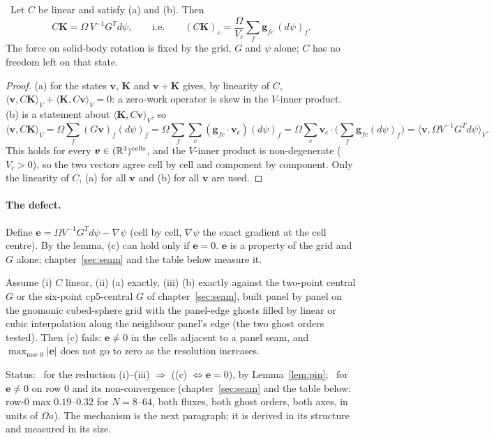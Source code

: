\begin{lemma}[pinning]\label{lem:pin}\derived\
Let $C$ be linear and satisfy (a) and (b). Then
\[ C\bm K=\Omega\,V^{-1}G^{T}d\psi ,\qquad\text{i.e.}\qquad
   (C\bm K)_c=\frac{\Omega}{V_c}\sum_f \bm g_{fc}\,(d\psi)_f . \]
The force on solid-body rotation is fixed by the grid, $G$ and $\psi$ alone; $C$ has no freedom left on that state.
\end{lemma}
\begin{proof}
(a) for the states $\bm v$, $\bm K$ and $\bm v+\bm K$ gives, by linearity of $C$,
$\langle\bm v,C\bm K\rangle_V+\langle\bm K,C\bm v\rangle_V=0$: a zero-work operator is skew in the $V$-inner
product. (b) is a statement about $\langle\bm K,C\bm v\rangle_V$, so
\[ \langle\bm v,C\bm K\rangle_V=\Omega\sum_f (G\bm v)_f(d\psi)_f=\Omega\sum_f\sum_c (\bm g_{fc}\cdot\bm v_c)(d\psi)_f
   =\Omega\sum_c \bm v_c\cdot\Big(\sum_f \bm g_{fc}(d\psi)_f\Big)=\langle\bm v,\Omega V^{-1}G^T d\psi\rangle_V .\]
This holds for every $\bm v\in(\mathbb R^3)^{\rm cells}$, and the $V$-inner product is non-degenerate ($V_c>0$),
so the two vectors agree cell by cell and component by component. Only the linearity of $C$, (a) for all $\bm v$
and (b) for all $\bm v$ are used.
\end{proof}

\paragraph{The defect.} Define $\bm e=\Omega V^{-1}G^T d\psi-\nabla\psi$ (cell by cell, $\nabla\psi$ the exact
gradient at the cell centre). By the lemma, (c) can hold only if $\bm e=0$. $\bm e$ is a property of the grid
and $G$ alone; chapter~\ref{sec:seam} and the table below measure it.

\begin{theorem}\label{thm:imp}
Assume (i) $C$ linear, (ii) (a) exactly, (iii) (b) exactly against the two-point central $G$ or the six-point
cp5-central $G$ of chapter~\ref{sec:seam}, built panel by panel on the gnomonic cubed-sphere grid with the
panel-edge ghosts filled by linear or cubic interpolation along the neighbour panel's edge (the two ghost orders
tested). Then (c) fails: $\bm e\ne0$ in the cells adjacent to a panel seam, and $\max_{\text{row }0}|\bm e|$ does
not go to zero as the resolution increases.
\end{theorem}
\noindent Status: \derived\ for the reduction (i)--(iii) $\Rightarrow$ ((c) $\Leftrightarrow\bm e=0$), by
Lemma~\ref{lem:pin}; \measured\ for $\bm e\ne0$ on row 0 and its non-convergence (chapter~\ref{sec:seam} and the
table below: row-0 max $0.19$--$0.32$ for $N=8$--$64$, both fluxes, both ghost orders, both axes, in units of
$\Omega a$). The mechanism is the next paragraph; it is derived in its structure and measured in its size.

